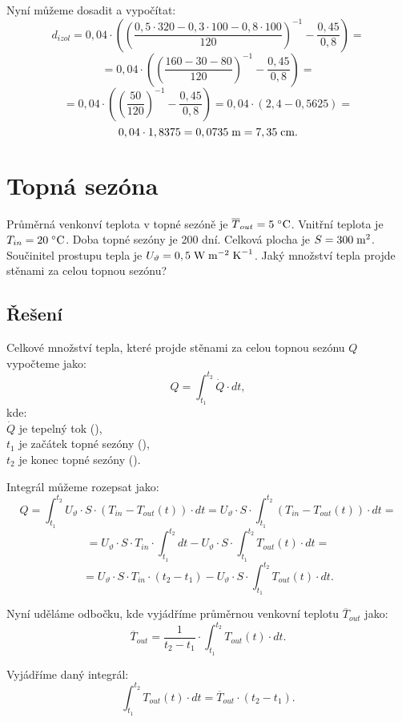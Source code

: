 \documentclass{article}
\begin{document}
Nyní můžeme dosadit a vypočítat:
$$
    d_{izol} = 0,04 \cdot \left( \left( \frac{0,5 \cdot 320 - 0,3 \cdot 100 - 0,8 \cdot 100}{120} \right)^{-1} - \frac{0,45}{0,8} \right) =
$$
$$
    = 0,04 \cdot \left( \left( \frac{160 - 30 - 80}{120} \right)^{-1} - \frac{0,45}{0,8} \right) =
$$
$$
    = 0,04 \cdot \left( \left( \frac{50}{120} \right)^{-1} - \frac{0,45}{0,8} \right) = 0,04 \cdot (2,4 - 0,5625) =
$$
$$
    0,04 \cdot 1,8375 = 0,0735 \; \textrm{m} = 7,35 \; \textrm{cm}.
$$

\newpage



\section{ Topná sezóna \spicy \spicy \spicy}
Průměrná venkonví teplota v topné sezóně je $\overline{T}_{out} = 5 \; ^\circ \textrm{C}$. Vnitřní teplota je $T_{in} = 20 \; ^\circ \textrm{C}$. Doba topné sezóny je 200 dní. Celková plocha je $S = 300 \; \textrm{m}^{\textrm{2}}$. Součinitel prostupu tepla je $U_\vartheta = 0,5 \; \textrm{W} \; \textrm{m}^{-2} \; \textrm{K}^{-1}$. Jaký množství tepla projde stěnami za celou topnou sezónu?

\subsection{Řešení}
Celkové množství tepla, které projde stěnami za celou topnou sezónu $Q$ vypočteme jako:
$$
    Q = \int_{t_1}^{t_2} \dot{Q} \cdot dt,
$$
kde:\\
$\dot{Q}$ je tepelný tok (\ueqW),\\
$t_1$ je začátek topné sezóny (\uH),\\
$t_2$ je konec topné sezóny (\uH).

Integrál můžeme rozepsat jako:
$$
    Q = \int_{t_1}^{t_2} U_\vartheta \cdot S \cdot (T_{in} - T_{out} (t)) \cdot dt = U_\vartheta \cdot S \cdot \int_{t_1}^{t_2} (T_{in} - T_{out} (t)) \cdot dt =
$$
$$
    = U_\vartheta \cdot S \cdot T_{in} \cdot \int_{t_1}^{t_2} dt - U_\vartheta \cdot S \cdot \int_{t_1}^{t_2} T_{out} (t) \cdot dt =
$$
$$
    = U_\vartheta \cdot S \cdot T_{in} \cdot (t_2 - t_1) - U_\vartheta \cdot S \cdot \int_{t_1}^{t_2} T_{out} (t) \cdot dt.
$$

Nyní uděláme odbočku, kde vyjádříme průměrnou venkovní teplotu $\overline{T}_{out}$ jako:
$$
    \overline{T}_{out} = \frac{1}{t_2 - t_1} \cdot \int_{t_1}^{t_2} T_{out} (t) \cdot dt.
$$

Vyjádříme daný integrál:
$$
    \int_{t_1}^{t_2} T_{out} (t) \cdot dt = \overline{T}_{out} \cdot (t_2 - t_1).
$$
\end{document}

